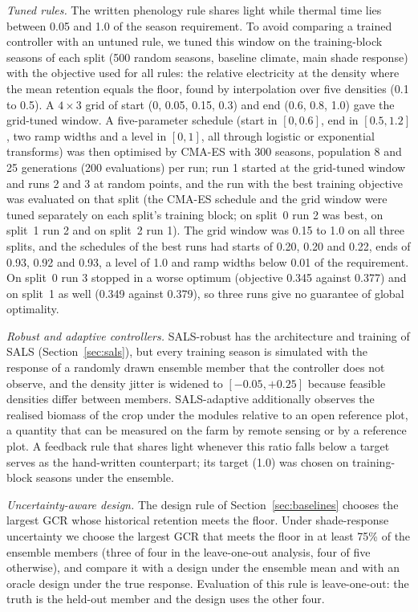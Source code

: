 \emph{Tuned rules.} The written phenology rule shares light while thermal time lies between 0.05 and 1.0 of the season requirement. To avoid comparing a trained controller with an untuned rule, we tuned this window on the training-block seasons of each split (500 random seasons, baseline climate, main shade response) with the objective used for all rules: the relative electricity at the density where the mean retention equals the floor, found by interpolation over five densities (0.1 to 0.5). A $4\times3$ grid of start (0, 0.05, 0.15, 0.3) and end (0.6, 0.8, 1.0) gave the grid-tuned window. A five-parameter schedule (start in $[0,0.6]$, end in $[0.5,1.2]$, two ramp widths and a level in $[0,1]$, all through logistic or exponential transforms) was then optimised by CMA-ES \citep{hansen2001} with 300 seasons, population 8 and 25 generations (200 evaluations) per run; run 1 started at the grid-tuned window and runs 2 and 3 at random points, and the run with the best training objective was evaluated on that split (the CMA-ES schedule and the grid window were tuned separately on each split's training block; on split~0 run 2 was best, on split~1 run 2 and on split~2 run 1). The grid window was 0.15 to 1.0 on all three splits, and the schedules of the best runs had starts of 0.20, 0.20 and 0.22, ends of 0.93, 0.92 and 0.93, a level of 1.0 and ramp widths below 0.01 of the requirement. On split~0 run 3 stopped in a worse optimum (objective 0.345 against 0.377) and on split~1 as well (0.349 against 0.379), so three runs give no guarantee of global optimality.

\emph{Robust and adaptive controllers.} SALS-robust has the architecture and training of SALS (Section~\ref{sec:sals}), but every training season is simulated with the response of a randomly drawn ensemble member that the controller does not observe, and the density jitter is widened to $[-0.05,+0.25]$ because feasible densities differ between members. SALS-adaptive additionally observes the realised biomass of the crop under the modules relative to an open reference plot, a quantity that can be measured on the farm by remote sensing or by a reference plot. A feedback rule that shares light whenever this ratio falls below a target serves as the hand-written counterpart; its target (1.0) was chosen on training-block seasons under the ensemble.

\emph{Uncertainty-aware design.} The design rule of Section~\ref{sec:baselines} chooses the largest GCR whose historical retention meets the floor. Under shade-response uncertainty we choose the largest GCR that meets the floor in at least 75\% of the ensemble members (three of four in the leave-one-out analysis, four of five otherwise), and compare it with a design under the ensemble mean and with an oracle design under the true response. Evaluation of this rule is leave-one-out: the truth is the held-out member and the design uses the other four.

